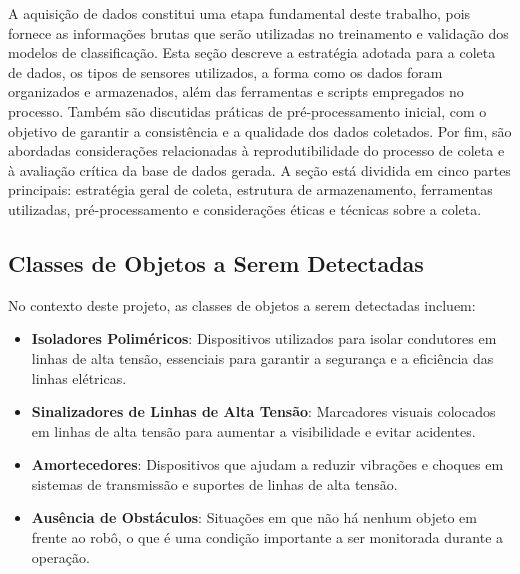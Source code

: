 A aquisição de dados constitui uma etapa fundamental deste trabalho, pois fornece as informações brutas que serão utilizadas no treinamento e validação dos modelos de classificação. Esta seção descreve a estratégia adotada para a coleta de dados, os tipos de sensores utilizados, a forma como os dados foram organizados e armazenados, além das ferramentas e scripts empregados no processo. Também são discutidas práticas de pré-processamento inicial, com o objetivo de garantir a consistência e a qualidade dos dados coletados. Por fim, são abordadas considerações relacionadas à reprodutibilidade do processo de coleta e à avaliação crítica da base de dados gerada. A seção está dividida em cinco partes principais: estratégia geral de coleta, estrutura de armazenamento, ferramentas utilizadas, pré-processamento e considerações éticas e técnicas sobre a coleta.

\subsection{Classes de Objetos a Serem Detectadas}

No contexto deste projeto, as classes de objetos a serem detectadas incluem:

\begin{itemize}
    \item \textbf{Isoladores Poliméricos}: Dispositivos utilizados para isolar condutores em linhas de alta tensão, essenciais para garantir a segurança e a eficiência das linhas elétricas.
    \item \textbf{Sinalizadores de Linhas de Alta Tensão}: Marcadores visuais colocados em linhas de alta tensão para aumentar a visibilidade e evitar acidentes.
    \item \textbf{Amortecedores}: Dispositivos que ajudam a reduzir vibrações e choques em sistemas de transmissão e suportes de linhas de alta tensão.
    \item \textbf{Ausência de Obstáculos}: Situações em que não há nenhum objeto em frente ao robô, o que é uma condição importante a ser monitorada durante a operação.
\end{itemize}



